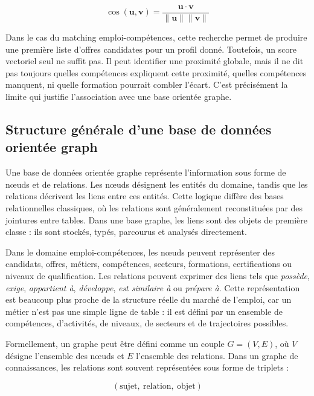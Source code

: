\documentclass[12pt,twoside]{report}
\renewcommand{\vec}[1]{\bm{#1}}
\begin{document}
\begin{equation}
\cos(\vec{u}, \vec{v}) =
\frac{\vec{u}\cdot\vec{v}}{\|\vec{u}\|\|\vec{v}\|}
\end{equation}

Dans le cas du matching emploi-compétences, cette recherche permet de produire une première liste d'offres candidates pour un profil donné. Toutefois, un score vectoriel seul ne suffit pas. Il peut identifier une proximité globale, mais il ne dit pas toujours quelles compétences expliquent cette proximité, quelles compétences manquent, ni quelle formation pourrait combler l'écart. C'est précisément la limite qui justifie l'association avec une base orientée graphe.

\subsection{Structure générale d'une base de données orientée graph}
Une base de données orientée graphe représente l'information sous forme de nœuds et de relations. Les nœuds désignent les entités du domaine, tandis que les relations décrivent les liens entre ces entités. Cette logique diffère des bases relationnelles classiques, où les relations sont généralement reconstituées par des jointures entre tables. Dans une base graphe, les liens sont des objets de première classe : ils sont stockés, typés, parcourus et analysés directement.

Dans le domaine emploi-compétences, les nœuds peuvent représenter des candidats, offres, métiers, compétences, secteurs, formations, certifications ou niveaux de qualification. Les relations peuvent exprimer des liens tels que \textit{possède}, \textit{exige}, \textit{appartient à}, \textit{développe}, \textit{est similaire à} ou \textit{prépare à}. Cette représentation est beaucoup plus proche de la structure réelle du marché de l'emploi, car un métier n'est pas une simple ligne de table : il est défini par un ensemble de compétences, d'activités, de niveaux, de secteurs et de trajectoires possibles.

Formellement, un graphe peut être défini comme un couple $G=(V,E)$, où $V$ désigne l'ensemble des nœuds et $E$ l'ensemble des relations. Dans un graphe de connaissances, les relations sont souvent représentées sous forme de triplets :

\begin{equation}
(\text{sujet},\ \text{relation},\ \text{objet})
\end{equation}
\end{document}
